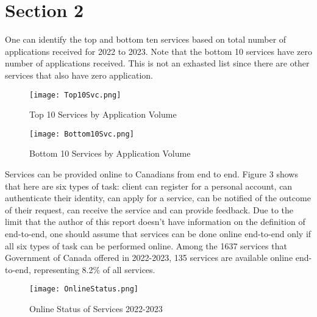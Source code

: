 \section{Section 2}

One can identify the top and bottom ten services based on total number of 
applications received for 2022 to 2023. Note that the bottom 10 services 
have zero number of applications received. This is not an exhasted list 
since there are other services that also have zero application. 

\begin{figure}[H]
    \centering
    \texttt{[image: Top10Svc.png]}
    \caption{\label{fig:Top10}Top 10 Services by Application Volume}
\end{figure}

\begin{figure}[H]
    \centering
    \texttt{[image: Bottom10Svc.png]}
    \caption{\label{fig:Bottom10}Bottom 10 Services by Application Volume}
\end{figure}

Services can be provided online to Canadians from end to end. Figure 3 shows 
that here are six types of task: client can register for a personal account, 
can authenticate their identity, can apply for a service, can be notified of 
the outcome of their request, can receive the service and can provide 
feedback. Due to the limit that the author of this report doesn't have 
information on the definition of end-to-end, one should assume that 
services can be done online end-to-end only if all six types of task can 
be performed online. Among the 1637 services that Government of Canada 
offered in 2022-2023, 135 services are available online end-to-end, 
representing 8.2\% of all services.

\begin{figure}[H]
    \centering
    \texttt{[image: OnlineStatus.png]}
    \caption{\label{fig:OnlStat}Online Status of Services 2022-2023}
\end{figure}
    